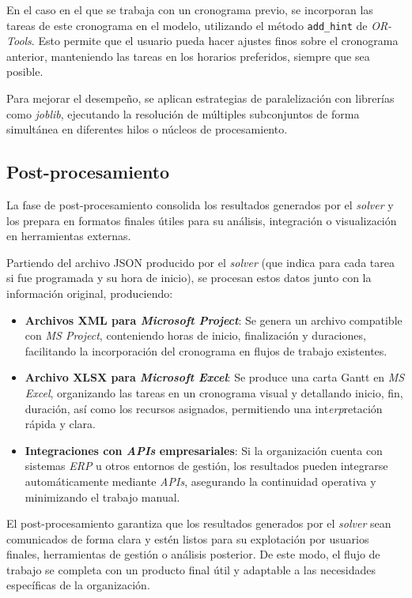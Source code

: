 \documentclass{article}
\begin{document}
En el caso en el que se trabaja con un cronograma previo, se incorporan las tareas de este cronograma en el modelo, utilizando el método \verb|add_hint| de \textit{OR-Tools}. Esto permite que el usuario pueda hacer ajustes finos sobre el cronograma anterior, manteniendo las tareas en los horarios preferidos, siempre que sea posible.

Para mejorar el desempeño, se aplican estrategias de paralelización con librerías como \textit{joblib}, ejecutando la resolución de múltiples subconjuntos de forma simultánea en diferentes hilos o núcleos de procesamiento.


\subsection{Post-procesamiento}

La fase de post-procesamiento consolida los resultados generados por el \textit{solver} y los prepara en formatos finales útiles para su análisis, integración o visualización en herramientas externas.

Partiendo del archivo JSON producido por el \textit{solver} (que indica para cada tarea si fue programada y su hora de inicio), se procesan estos datos junto con la información original, produciendo:

\begin{itemize}
    \item \textbf{Archivos XML para \textit{Microsoft Project}}: Se genera un archivo compatible con \textit{MS Project}, conteniendo horas de inicio, finalización y duraciones, facilitando la incorporación del cronograma en flujos de trabajo existentes.

    \item \textbf{Archivo XLSX para \textit{Microsoft Excel}}: Se produce una carta Gantt en \textit{MS Excel}, organizando las tareas en un cronograma visual y detallando inicio, fin, duración, así como los recursos asignados, permitiendo una int\textit{erp}retación rápida y clara.

    \item \textbf{Integraciones con \textit{APIs} empresariales}: Si la organización cuenta con sistemas \textit{ERP} u otros entornos de gestión, los resultados pueden integrarse automáticamente mediante \textit{APIs}, asegurando la continuidad operativa y minimizando el trabajo manual.
\end{itemize}

El post-procesamiento garantiza que los resultados generados por el \textit{solver} sean comunicados de forma clara y estén listos para su explotación por usuarios finales, herramientas de gestión o análisis posterior. De este modo, el flujo de trabajo se completa con un producto final útil y adaptable a las necesidades específicas de la organización.
\end{document}
